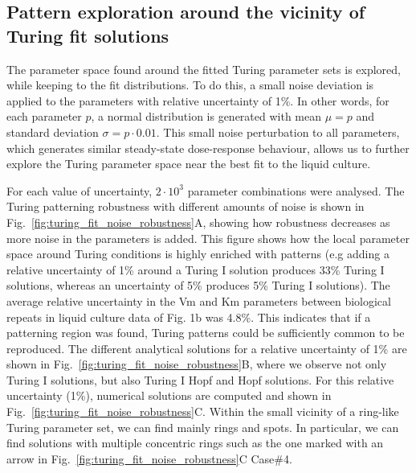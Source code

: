 \subsection{Pattern exploration around the vicinity of Turing fit solutions}
The parameter space found around the fitted Turing parameter sets is explored, while keeping to the fit distributions. To do this, a small noise deviation is applied to the parameters with relative uncertainty of 1\%.
In other words, for each parameter $p$, a normal distribution is generated with mean $\mu=p$ and standard deviation $\sigma=p\cdot 0.01$.
This small noise perturbation to all parameters, which generates similar steady-state dose-response behaviour, allows us to further explore the Turing parameter space near the best fit to the liquid culture.

For each value of uncertainty, $2\cdot10^3$ parameter combinations were analysed.
The Turing patterning robustness with different amounts of noise is shown in Fig.~\ref{fig:turing_fit_noise_robustness}A, showing how robustness decreases as more noise in the parameters is added.
This figure shows how the local parameter space around Turing conditions is highly enriched with patterns (e.g adding a relative uncertainty of 1\% around a Turing I solution produces 33\% Turing I solutions, whereas an uncertainty of 5\% produces 5\% Turing I solutions).
The average relative uncertainty in the Vm and Km parameters between biological repeats in liquid culture data of Fig. 1b was 4.8\%.
This indicates that if a patterning region was found, Turing patterns could be sufficiently common to be reproduced.
The different analytical solutions for a relative uncertainty of 1\% are shown in Fig.~\ref{fig:turing_fit_noise_robustness}B, where we observe not only Turing I solutions, but also Turing I Hopf and Hopf solutions.
For this relative uncertainty (1\%), numerical solutions are computed and shown in Fig.~\ref{fig:turing_fit_noise_robustness}C.
Within the small vicinity of a ring-like Turing parameter set, we can find mainly rings and spots.
In particular, we can find solutions with multiple concentric rings such as the one marked with an arrow in Fig.~\ref{fig:turing_fit_noise_robustness}C Case\#4.

